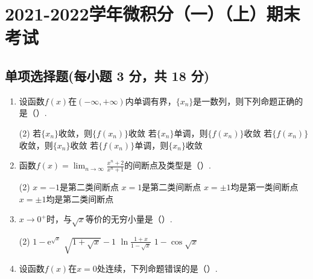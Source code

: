 \documentclass[../Main.tex]{subfiles}
\begin{document}
\chapter{2021-2022学年微积分（一）（上）期末考试}

\section{单项选择题(每小题 3 分，共 18 分)}
\begin{enumerate}
    \item 设函数$f(x)$在$(-\infty,+\infty)$内单调有界，$\{x_{n}\}$是一数列，则下列命题正确的是（\qquad）.

          \begin{tasks}[label=\textbf{\Alph*.}, label-width=1.5em, column-sep=1em](2)
              \task 若$\{x_{n}\}$收敛，则$\{f(x_{n})\}$收敛
              \task 若$\{x_{n}\}$单调，则$\{f(x_{n})\}$收敛
              \task 若$\{f(x_{n})\}$收敛，则$\{x_{n}\}$收敛
              \task 若$\{f(x_{n})\}$单调，则$\{x_{n}\}$收敛
          \end{tasks}
          \vspace{1em}

    \item 函数$f(x)=\lim_{n\to\infty}\frac{x^{n}+2}{x^{n}+1}$的间断点及类型是（\qquad）.

          \begin{tasks}[label=\textbf{\Alph*.}, label-width=1.5em, column-sep=1em](2)
              \task $x=-1$是第二类间断点
              \task $x=1$是第二类间断点
              \task $x=\pm1$均是第一类间断点
              \task $x=\pm 1$均是第二类间断点
          \end{tasks}
          \vspace{1em}

    \item $x\to0^{+}$时，与$\sqrt{x}$等价的无穷小量是（\qquad）.

          \begin{tasks}[label=\textbf{\Alph*.}, label-width=1.5em, column-sep=1em](2)
              \task $1-\mathrm{e}^{\sqrt{x}}$
              \task $\sqrt{1+\sqrt{x}}-1$
              \task $\ln\frac{1+x}{1-\sqrt{x}}$
              \task $1-\cos{\sqrt{x}}$
          \end{tasks}
          \vspace{1em}

    \item 设函数$f(x)$在$x=0$处连续，下列命题错误的是（\qquad）.


\end{enumerate}
\end{document}

